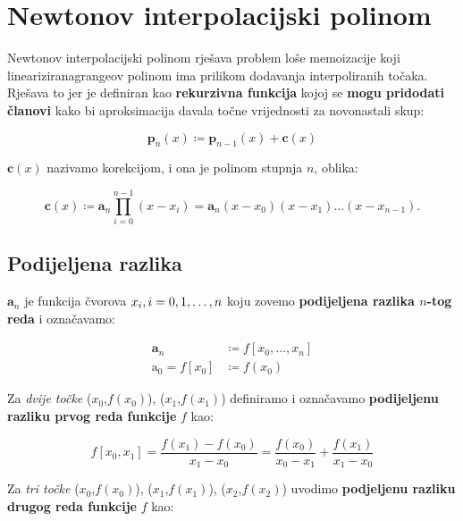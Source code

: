 
\section{Newtonov interpolacijski polinom}

Newtonov interpolacijski polinom rješava problem loše memoizacije koji lineariziranagrangeov polinom ima prilikom dodavanja interpoliranih točaka. Rješava to jer je definiran kao \textbf{rekurzivna funkcija} kojoj se \textbf{mogu pridodati članovi} kako bi aproksimacija davala točne vrijednosti za novonastali skup:

\begin{equation}
{\mathbf p}_n(x) \coloneq \mathbf{p}_{n-1}(x) + \mathbf{c}(x)
\end{equation}

${\mathbf c}(x)$ nazivamo korekcijom, i ona je polinom stupnja $n$, oblika:

\begin{equation}
{\mathbf c}(x) \coloneq {\mathbf a}_n\prod_{i=0}^{n-1}(x-x_i) = {\mathbf a}_n(x-x_0)(x-x_1)\dots(x-x_{n-1}).
\end{equation}

\subsection{Podijeljena razlika}

$\mathbf{a}_n$ je funkcija čvorova $x_i,\space i=0, 1, \dots, n$ koju zovemo \textbf{podijeljena razlika $n$-tog reda} i označavamo:

\begin{align*}
\mathbf{a}_n &\coloneq f[x_0,\dots,x_n]\\
\mathrm{a}_0 = f[x_0] &\coloneq f(x_0)
\end{align*}

Za \textit{dvije točke} ($x_0$,$f(x_0)$), ($x_1$,$f(x_1)$) definiramo i označavamo \textbf{podijeljenu razliku prvog reda funkcije} $f$ kao:

$$
f[x_0, x_1] = \frac{f(x_1)-f(x_0)}{x_1 - x_0} = \frac{f(x_0)}{x_0 - x_1} + \frac{f(x_1)}{x_1 - x_0}
$$

Za \textit{tri točke} ($x_0$,$f(x_0)$), ($x_1$,$f(x_1)$), ($x_2$,$f(x_2)$) uvodimo \textbf{podjeljenu razliku drugog reda funkcije} $f$ kao:

